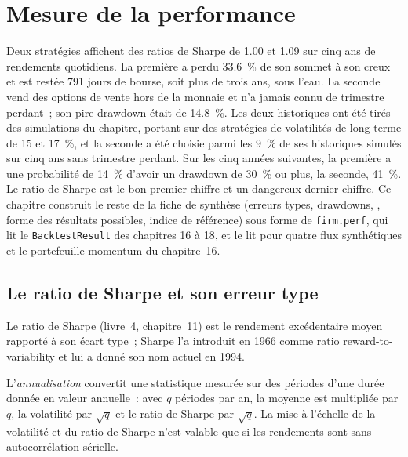 \chapter{Mesure de la performance}\label{ch:rs:performance-measurement}

Deux stratégies affichent des ratios de Sharpe de 1.00 et 1.09 sur cinq ans de rendements quotidiens. La première a perdu 33.6~\% de son sommet à son creux et est restée 791 jours de
bourse, soit plus de trois ans, sous l'eau. La seconde vend des options de vente hors de la monnaie et n'a jamais connu de trimestre perdant~; son pire drawdown était de 14.8~\%.
Les deux historiques ont été tirés des simulations du chapitre, portant sur des stratégies de volatilités de long terme de 15 et 17~\%, et la seconde a été choisie
parmi les 9~\% de ses historiques simulés sur cinq ans sans trimestre perdant. Sur les cinq années suivantes, la première a une probabilité de 14~\% d'avoir un drawdown de
30~\% ou plus, la seconde, 41~\%. Le ratio de Sharpe est le bon premier chiffre et un dangereux dernier chiffre. Ce chapitre construit le reste de la fiche
de synthèse (erreurs types, drawdowns, , forme des résultats possibles, indice de référence) sous forme de \texttt{firm.perf}, qui lit le \texttt{BacktestResult} des
chapitres 16 à 18, et le lit pour quatre flux synthétiques et le portefeuille momentum du chapitre~16.

\section{Le ratio de Sharpe et son erreur type}

Le ratio de Sharpe (livre~4, chapitre~11) est le rendement excédentaire moyen rapporté à son écart type~; Sharpe l'a introduit en 1966 comme ratio reward-to-variability
et lui a donné son nom actuel en 1994.

\begin{definition}[Annualisation]\label{def:rs:performance-measurement:annualisation}
L'\emph{annualisation} convertit une statistique mesurée sur des périodes d'une durée donnée en valeur annuelle~: avec $q$ périodes par an, la moyenne est multipliée par $q$,
la volatilité par $\sqrt q$ et le ratio de Sharpe par $\sqrt q$. La mise à l'échelle de la volatilité et du ratio de Sharpe n'est valable que si les rendements sont
sans autocorrélation sérielle.
\end{definition}

